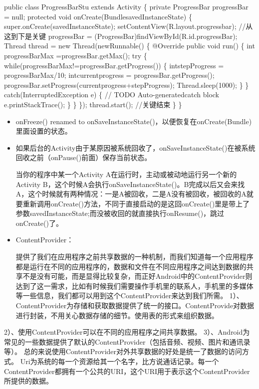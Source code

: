 \documentclass[9pt, b5paper]{article}
\begin{document}
public class ProgressBarStu extends Activity \{
private ProgressBar progressBar = null;
protected void onCreate(BundlesavedInstanceState) \{
super.onCreate(savedInstanceState);
setContentView(R.layout.progressbar);
//从这到下是关键
progressBar = (ProgressBar)findViewById(R.id.progressBar);
Thread thread = new Thread(newRunnable() \{
@Override
public void run() \{
int progressBarMax =progressBar.getMax();
try \{
while(progressBarMax!=progressBar.getProgress())
\{
intstepProgress = progressBarMax/10;
intcurrentprogress = progressBar.getProgress();
progressBar.setProgress(currentprogress+stepProgress);
Thread.sleep(1000);
\}
\} catch(InterruptedException e) \{
// TODO Auto-generatedcatch block
e.printStackTrace();
\}
\}
\});
thread.start();
//关键结束
\}
\}
\begin{itemize}
\item onFreeze() renamed to onSaveInstanceState()，以便恢复在onCreate(Bundle)里面设置的状态。

\item 如果后台的Activity由于某原因被系统回收了，onSaveInstanceState()在被系统回收之前（onPause()前面）保存当前状态。

当你的程序中某一个Activity A在运行时，主动或被动地运行另一个新的Activity B，这个时候A会执行onSaveInstanceState()。B完成以后又会来找A，这个时候就有两种情况：一是A被回收，二是A没有被回收，被回收的A就要重新调用onCreate()方法，不同于直接启动的是这回onCreate()里是带上了参数savedInstanceState;而没被收回的就直接执行onResume()，跳过onCreate()了。

\item ContentProvider：

提供了我们在应用程序之前共享数据的一种机制，而我们知道每一个应用程序都是运行在不同的应用程序的，数据和文件在不同应用程序之间达到数据的共享不是没有可能，而是显得比较复杂，而正好Android中的ContentProvider则达到了这一需求，比如有时候我们需要操作手机里的联系人，手机里的多媒体等一些信息，我们都可以用到这个ContentProvider来达到我们所需。
1）、ContentProvider为存储和获取数据提供了统一的接口。ContentProvide对数据进行封装，不用关心数据存储的细节。使用表的形式来组织数据。
\end{itemize}
2）、使用ContentProvider可以在不同的应用程序之间共享数据。 
3）、Android为常见的一些数据提供了默认的ContentProvider（包括音频、视频、图片和通讯录等）。 
总的来说使用ContentProvider对外共享数据的好处是统一了数据的访问方式。
    Uri为系统的每一个资源给其一个名字，比方说通话记录。每一个ContentProvider都拥有一个公共的URI，这个URI用于表示这个ContentProvider所提供的数据。 
\end{document}
